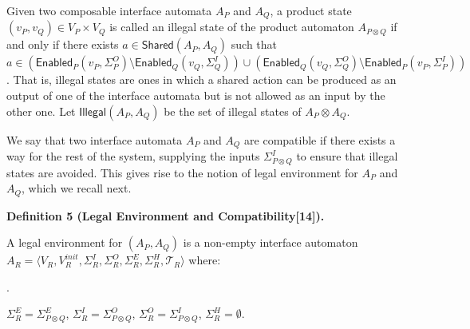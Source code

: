  
 
Given two composable interface automata $A_{P}$ and $A_{Q}$, a product state $(v_{P},v_{Q})\in V_{P}\times V_{Q}$ is called an illegal state of the product automaton $A_{P\otimes Q}$ if and only if there exists $a\in\mathsf{Shared}(A_{P},A_{Q})$ such that $a\in(\mathsf{Enabled}_{P}(v_{P},\Sigma_{P}^{O})\setminus\mathsf{Enabled}_{Q}(v_{Q},\Sigma_{Q}^{I}))\cup(\mathsf{Enabled}_{Q}(v_{Q},\Sigma_{Q}^{O})\setminus\mathsf{Enabled}_{P}(v_{P},\Sigma_{P}^{I}))$. That is, illegal states are ones in which a shared action can be produced as an output of one of the interface automata but is not allowed as an input by the other one. Let $\mathsf{Illegal}(A_{P},A_{Q})$ be the set of illegal states of $A_{P}\otimes A_{Q}$.\par
 
 
 
We say that two interface automata $A_{P}$ and $A_{Q}$ are compatible if there exists a way for the rest of the system, supplying the inputs $\Sigma_{P\otimes Q}^{I}$ to ensure that illegal states are avoided. This gives rise to the notion of legal environment for $A_{P}$ and $A_{Q}$, which we recall next.\par
 
 
 
\par\medskip\noindent\textbf{Definition 5 (Legal Environment and Compatibility[14]).}\par
 
 
A legal environment for $(A_{P},A_{Q})$ is a non-empty interface automaton $A_{R}=\langle V_{R},V_{R}^{init},\Sigma_{R}^{I},\Sigma_{R}^{O},\Sigma_{R}^{E},\Sigma_{R}^{H},\mathcal{T}_{R}\rangle$ where:\par
 
 
  
\par{}. 
 
$\Sigma_{R}^{E}=\Sigma_{P\otimes Q}^{E}$, $\Sigma_{R}^{I}=\Sigma_{P\otimes Q}^{O}$, $\Sigma_{R}^{O}=\Sigma_{P\otimes Q}^{I}$, $\Sigma_{R}^{H}=\emptyset$.\par
 

